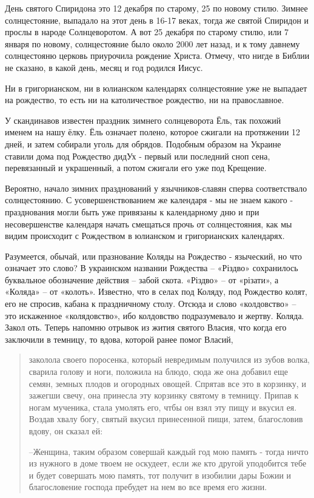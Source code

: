 \documentclass[a5paper,11pt,openany]{article}
\begin{document}
   День святого Спиридона это 12 декабря по старому, 25 по новому стилю. Зимнее солнцестояние, выпадало на этот день в 16-17 веках, тогда же святой Спиридон и прослы в народе Солнцеворотом. А вот 25 декабря по старому стилю, или 7 января по новому, солнцестояние было около 2000 лет назад, и к тому давнему солнцестояню церковь приурочила рождение Христа. Отмечу, что нигде в Библии не сказано, в какой день, месяц и год родился Иисус.

   Ни в григорианском, ни в юлианском календарях солнцестояние уже не выпадает на рождество, то есть ни на католичествое рождество, ни на православное.

   У скандинавов известен праздник зимнего солнцеворота Ёль, так похожий именем на нашу ёлку. Ёль означает полено, которое сжигали на протяжении 12 дней, и затем собирали уголь для обрядов. Подобным образом на Украине ставили дома под Рождество дидУх - первый или последний сноп сена, перевязанный и украшенный, а потом сжигали его уже под Крещение.

   Вероятно, начало зимних празднований у язычников-славян сперва соответствало  солнцестоянию. С усовершенствованием же календаря - мы не знаем какого - празднования могли быть уже привязаны к календарному дню и при несовершенстве календаря начать смещаться прочь от солнцестояния, как мы видим происходит с Рождеством в юлианском и григорианских календарях.

   Разумеется, обычай, или празнование Коляды  на Рождество - языческий, но что означает это слово? В украинском названии
Рождества – «Різдво» сохранилось буквальное обозначение действия – забой скота. «Різдво» – от «різати», а «Коляда» – от «колоть». Известно, что в селах под Коляду, под Рождество колят, его не спросив, кабана к праздничному столу. Отсюда и слово «колдовство» – это искаженное «колядовство», ибо колдовство подразумевало и жертву.
   Коляда. Закол
оть. Теперь напомню отрывок из жития святого Власия, что когда его заключили в темницу, то вдова, которой ранее помог Власий,

\begin{quotation}
\noindent заколола своего поросенка, который невредимым получился из зубов волка, сварила голову и ноги, положила на блюдо, сюда же она добавил еще семян, земных плодов и огородных овощей. Спрятав все это в корзинку, и зажегши свечу, она принесла эту корзинку святому в темницу. Припав к ногам мученика, стала умолять его, чтбы он взял эту пищу и вкусил ея. Воздав хвалу богу, святый вкусил принесенной пищи, затем, благословив вдову, он сказал ей:

--Женщина, таким образом совершай каждый год мою память - тогда ничто из нужного в доме твоем не оскудеет, если же кто другой уподобится тебе и будет совершать мою память, тот получит в изобилии дары Божии и благословение господа пребудет на нем во все время его жизни.
\end{quotation}
\end{document}
